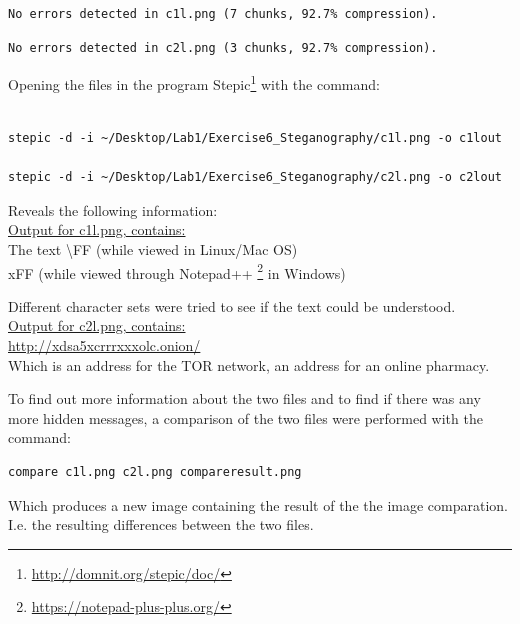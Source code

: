 \documentclass[a4paper,10pt,oneside]{article}
\begin{document}
\begin{lstlisting}[caption=c1l.png]
No errors detected in c1l.png (7 chunks, 92.7% compression).
\end{lstlisting}

\begin{lstlisting}[caption=c2l.png]
No errors detected in c2l.png (3 chunks, 92.7% compression).
\end{lstlisting}

Opening the files in the program Stepic\footnote{\url{http://domnit.org/stepic/doc/}}
with the command:

\begin{lstlisting}[caption=stepic command]

stepic -d -i ~/Desktop/Lab1/Exercise6_Steganography/c1l.png -o c1lout

stepic -d -i ~/Desktop/Lab1/Exercise6_Steganography/c2l.png -o c2lout

\end{lstlisting}

Reveals the following information:\\

\underline{Output for c1l.png, contains:}\\
\newline
The text \textbackslash FF (while viewed in Linux/Mac OS)\\xFF (while viewed through Notepad++
\footnote{\url{https://notepad-plus-plus.org/}}
in Windows)
\newline

Different character sets were tried to see if the text could be understood.\\


\underline{Output for c2l.png, contains:}\\
\newline
\url{http://xdsa5xcrrrxxxolc.onion/}\\

Which is an address for the TOR network, an address for an online pharmacy.


To find out more information about the two files and to find if there was any more hidden messages, a comparison of the two files were performed with the command:\\

\begin{lstlisting}
compare c1l.png c2l.png compareresult.png
\end{lstlisting}

Which produces a new image containing the result of the the image comparation. I.e. the resulting differences between the two files.
\end{document}
